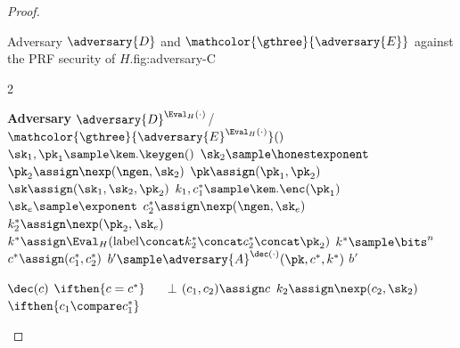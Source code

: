 \begin{proof}
                                \begin{gamefigure}{Adversary $\adversary{D}$ and $\mathcolor{\gthree}{\adversary{E}}$ against the PRF security of $H$.}{fig:adversary-C}
                                    \begin{games}{2}
                                        \begin{gameenv}{\textbf{Adversary} $\adversary{D}^{\Eval_H(\cdot)}$/$\mathcolor{\gthree}{\adversary{E}^{\Eval_H(\cdot)}}()$}
                                            \State $\sk_1, \pk_1 \sample \kem.\keygen()$
                                            \State $\sk_2 \sample \honestexponent$
                                            \State $\pk_2 \assign \nexp(\ngen, \sk_2)$
                                            \State $\pk \assign (\pk_1, \pk_2)$
                                            \State $\sk \assign (\sk_1, \sk_2, \pk_2)$
                                            \State $k_1, c^*_1 \sample \kem.\enc(\pk_1)$
                                            \State $\sk_e \sample \exponent$
                                            \State $c^*_2 \assign \nexp(\ngen, \sk_e)$
                                            \State $k^*_2 \assign \nexp(\pk_2, \sk_e)$
                                            \State $k^* \assign \Eval_{H}(\text{label} \concat k^*_2 \concat c^*_2\concat \pk_2)$
                                            \BeginBox[draw=\gthree]
                                            \State $k^* \sample \bits^{n}$ \label{line:c-hqb-sampled}
                                            \EndBox
                                            \State $c^* \assign (c_1^*, c_2^*)$
                                            \State $b' \sample \adversary{A}^{\dec(\cdot)}(\pk, c^*, k^*)$
                                            \State \Return $b'$
                                        \end{gameenv}
                                        \gamebreak
                                        \begin{gameenv}{\oracle $\dec(c)$}
                                            \State $\ifthen{c = c^*}$
                                                \State $\quad$ \Return $\bot$
                                                \State $(c_1, c_2) \assign c$
                                                \State $k_2 \assign \nexp(c_2, \sk_2)$
                                                \State $\ifthen{c_1 \compare c^*_1}$

\end{gameenv}
\end{games}
\end{gamefigure}
\end{proof}
